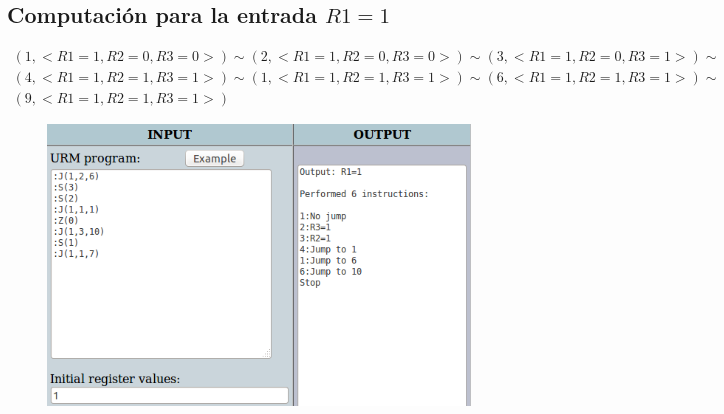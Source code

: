 	\subsection{Computación para la entrada $R1=1$}
	\begin{equation*}\begin{gathered}
	(1, <R1=1, R2=0, R3=0>) \sim (2, <R1=1, R2=0, R3=0>) \sim (3, <R1=1, R2=0, R3=1>) \sim\\
	(4, <R1=1, R2=1, R3=1>) \sim (1, <R1=1, R2=1, R3=1>) \sim (6, <R1=1, R2=1, R3=1>) \sim\\
	(9, <R1=1, R2=1, R3=1>)
	\end{gathered}\end{equation*}
	\begin{figure}[H]
  		\centering
  		\includegraphics[scale=0.5]{images/61.png}
  	\end{figure}
